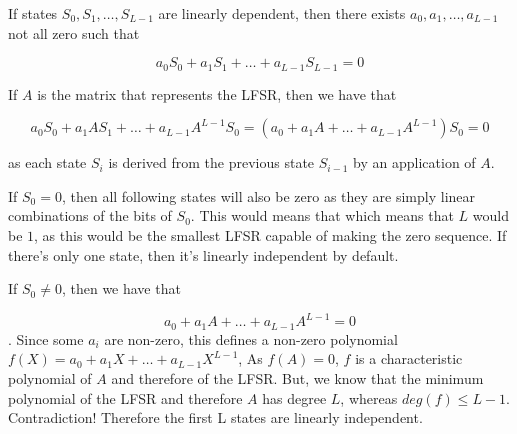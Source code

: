 \begin{enumerate}
If states $S_0, S_1, \dots, S_{L-1}$ are linearly dependent, then there exists
$a_0, a_1, \dots, a_{L-1}$ not all zero such that

\[a_0S_0 + a_1 S_1 + \dots + a_{L-1} S_{L-1} = 0 \]

If $A$ is the matrix that represents the LFSR, then we have that

\[a_0S_0 + a_1 A S_1 + \dots + a_{L-1} A^{L-1} S_0 = \left(a_0 + a_1 A +
\dots + a_{L-1} A^{L-1} \right) S_0 = 0 \]

as each state $S_i$ is derived from the previous state $S_{i-1}$ by an
application of $A$.

If $S_0=0$, then all following states will also be zero as
they are simply linear combinations of the bits of $S_0$. This would means that
which means that $L$ would be $1$, as this would be the smallest LFSR capable of
making the zero sequence. If there's only one state, then it's linearly
independent by default.

If $S_0 \neq 0$, then we have that

\[a_0 + a_1 A + \dots + a_{L-1} A^{L-1} = 0 \]. Since some $a_i$ are non-zero,
this defines a non-zero polynomial $f(X) = a_0 + a_1 X + \dots + a_{L-1}
X^{L-1}$, As $f(A) = 0$, $f$ is a characteristic polynomial of $A$ and therefore
of the LFSR.  But, we know that the minimum polynomial of the LFSR and therefore
$A$ has degree $L$, whereas $deg(f) \leq L - 1$. Contradiction! Therefore the
first L states are linearly independent.

\end{enumerate}
